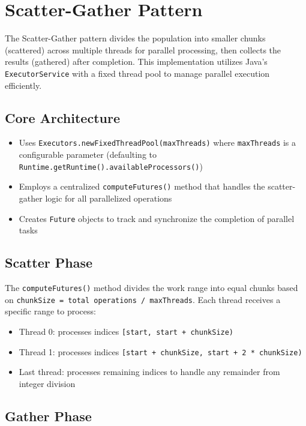 \newpage

\section{Scatter-Gather Pattern}\label{sec:scatter-gather}

The Scatter-Gather pattern divides the population into smaller chunks (scattered) across multiple threads for parallel processing, then collects the results (gathered) after completion. This implementation utilizes Java's \texttt{ExecutorService} with a fixed thread pool to manage parallel execution efficiently.

\subsection{Core Architecture}

\begin{itemize}
    \item Uses \texttt{Executors.newFixedThreadPool(maxThreads)} where \texttt{maxThreads} is a configurable parameter (defaulting to \texttt{Runtime.getRuntime().availableProcessors()})
    \item Employs a centralized \texttt{computeFutures()} method that handles the scatter-gather logic for all parallelized operations
    \item Creates \texttt{Future} objects to track and synchronize the completion of parallel tasks
\end{itemize}

\subsection{Scatter Phase}
The \texttt{computeFutures()} method divides the work range into equal chunks based on \texttt{chunkSize = total operations / maxThreads}. Each thread receives a specific range to process:

\begin{itemize}
    \item Thread 0: processes indices \texttt{[start, start + chunkSize)}
    \item Thread 1: processes indices \texttt{[start + chunkSize, start + 2 * chunkSize)}
    \item Last thread: processes remaining indices to handle any remainder from integer division
\end{itemize}

\subsection{Gather Phase}

